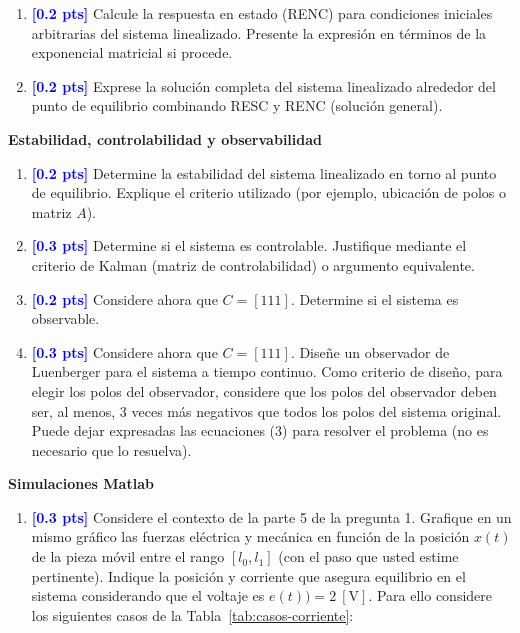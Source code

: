 \documentclass[
  11pt,
  letterpaper,
   addpoints,
   answers
  ]{exam}
\begin{document}
\begin{questions}
\begin{enumerate}
  \item \textcolor{blue}{\textbf{[0.2 pts]}} Calcule la respuesta en estado (RENC) para condiciones iniciales arbitrarias del sistema linealizado. Presente la expresión en términos de la exponencial matricial si procede.

  \item \textcolor{blue}{\textbf{[0.2 pts]}} Exprese la solución completa del sistema linealizado alrededor del punto de equilibrio combinando RESC y RENC (solución general).
\end{enumerate}

\question \textbf{Estabilidad, controlabilidad y observabilidad}
\begin{enumerate}
  \item \textcolor{blue}{\textbf{[0.2 pts]}} Determine la estabilidad del sistema linealizado en torno al punto de equilibrio. Explique el criterio utilizado (por ejemplo, ubicación de polos o matriz $A$).

  \item \textcolor{blue}{\textbf{[0.3 pts]}} Determine si el sistema es controlable. Justifique mediante el criterio de Kalman (matriz de controlabilidad) o argumento equivalente.

  \item \textcolor{blue}{\textbf{[0.2 pts]}} Considere ahora que $C = [111]$. Determine si el sistema es observable.

  \item \textcolor{blue}{\textbf{[0.3 pts]}} Considere ahora que $C = [111]$. Diseñe un observador de Luenberger para el sistema a tiempo continuo. Como criterio de diseño, para elegir los polos del observador, considere que los polos del observador deben ser, al menos, 3 veces más negativos que todos los polos del sistema original. Puede dejar expresadas las ecuaciones (3) para resolver el problema (no es necesario que lo resuelva).
\end{enumerate}

\question \textbf{Simulaciones Matlab}

\begin{enumerate}
  \item \textcolor{blue}{\textbf{[0.3 pts]}} Considere el contexto de la parte 5 de la pregunta 1. Grafique en un mismo gráfico las fuerzas eléctrica y mecánica en función de la posición $x(t)$ de la pieza móvil entre el rango $[l_0, l_1]$ (con el paso que usted estime pertinente). Indique la posición y corriente que asegura equilibrio en el sistema considerando que el voltaje es $e(t)) = 2~[\text{V}]$. Para ello considere los siguientes casos de la Tabla~\ref{tab:casos-corriente}:


\end{enumerate}
\end{questions}
\end{document}
